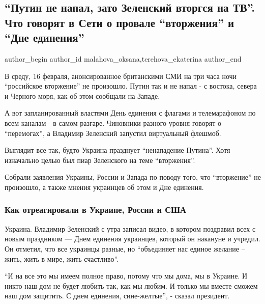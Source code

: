 
 
 
 
 
 
\subsection{\enquote{Путин не напал, зато Зеленский вторгся на ТВ}. Что говорят в Сети о провале \enquote{вторжения} и \enquote{Дне единения}}
\label{sec:16_02_2022.stz.news.ua.strana.4.putin_ne_napal}
 
\ifcmt
 author_begin
   author_id malahova_oksana,terehova_ekaterina
 author_end
\fi

В среду, 16 февраля, анонсированное британскими СМИ на три часа ночи
\enquote{российское вторжение} не произошло. Путин так и не напал - с востока, севера и
Черного моря, как об этом сообщали на Западе.


А вот запланированный властями День единения с флагами и телемарафоном по всем
каналам - в самом разгаре. Чиновники разного уровня говорят о \enquote{перемогах}, а
Владимир Зеленский запустил виртуальный флешмоб.

Выглядит все так, будто Украина празднует \enquote{ненападение Путина}. Хотя изначально
целью был пиар Зеленского на теме \enquote{вторжения}.

Собрали заявления Украины, России и Запада по поводу того, что \enquote{вторжение} не
произошло, а также мнения украинцев об этом и Дне единения.

\subsubsection{Как отреагировали в Украине, России и США}

Украина. Владимир Зеленский с утра записал видео, в котором поздравил всех с
новым праздником — Днем единения украинцев, который он накануне и учредил. Он
отметил, что все украинцы разные, но \enquote{объединяет нас единое желание – жить,
жить в мире, жить счастливо}.

\enquote{И на все это мы имеем полное право, потому что мы дома, мы в Украине. И никто
наш дом не будет любить так, как мы любим. И только мы вместе сможем наш дом
защитить. С днем единения, сине-желтые}, - сказал президент.
